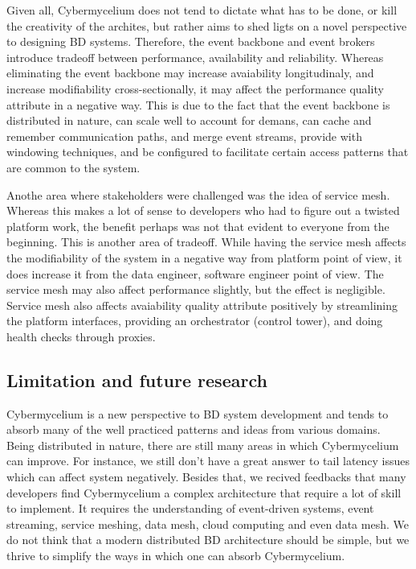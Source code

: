 \documentclass[review]{elsarticle}
\begin{document}
Given all, Cybermycelium does not tend to dictate what has to be done, or kill the creativity of the archites, but rather aims to shed ligts on a novel perspective to designing BD systems. Therefore, the event backbone and event brokers introduce tradeoff between performance, availability and reliability. Whereas eliminating the event backbone may increase avaiability longitudinaly, and increase modifiability cross-sectionally, it may affect the performance quality attribute in a negative way. This is due to the fact that the event backbone is distributed in nature, can scale well to account for demans, can cache and remember communication paths, and merge event streams, provide with windowing techniques, and be configured to facilitate certain access patterns that are common to the system.

Anothe area where stakeholders were challenged was the idea of service mesh. Whereas this makes a lot of sense to developers who had to figure out a twisted platform work, the benefit perhaps was not that evident to everyone from the beginning. This is another area of tradeoff. While having the service mesh affects the modifiability of the system in a negative way from platform point of view, it does increase it from the data engineer, software engineer point of view. The service mesh may also affect performance slightly, but the effect is negligible. Service mesh also affects avaiability quality attribute positively by streamlining the platform interfaces, providing an orchestrator (control tower), and doing health checks through proxies.

\subsection{Limitation and future research}

Cybermycelium is a new perspective to BD system development and tends to absorb many of the well practiced patterns and ideas from various domains. Being distributed in nature, there are still many areas in which Cybermycelium can improve. For instance, we still don't have a great answer to tail latency issues which can affect system negatively. Besides that, we recived feedbacks that many developers find Cybermycelium a complex architecture that require a lot of skill to implement. It requires the understanding of event-driven systems, event streaming, service meshing, data mesh, cloud computing and even data mesh. We do not think that a modern distributed BD architecture should be simple, but we thrive to simplify the ways in which one can absorb Cybermycelium.
\end{document}
